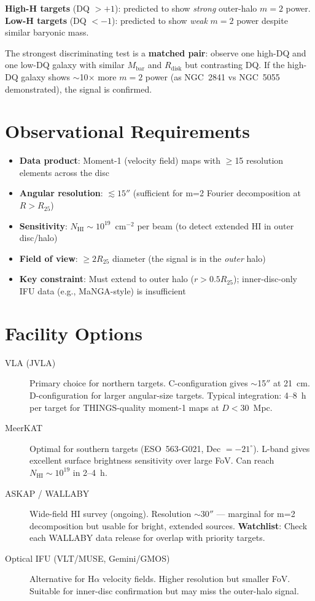 \documentclass[11pt]{article}
\newcommand{\mtwo}{m{=}2}
\begin{document}
\textbf{High-H targets} (DQ $> +1$): predicted to show \emph{strong} outer-halo $\mtwo$ power.\\
\textbf{Low-H targets} (DQ $< -1$): predicted to show \emph{weak} $\mtwo$ power despite similar baryonic mass.

The strongest discriminating test is a \textbf{matched pair}: observe one high-DQ and one low-DQ galaxy with similar $M_\mathrm{bar}$ and $R_\mathrm{disk}$ but contrasting DQ.
If the high-DQ galaxy shows $\sim$10$\times$ more $\mtwo$ power (as NGC~2841 vs NGC~5055 demonstrated), the signal is confirmed.

\section{Observational Requirements}

\begin{itemize}
\item \textbf{Data product}: Moment-1 (velocity field) maps with $\geq$15 resolution elements across the disc
\item \textbf{Angular resolution}: $\lesssim 15''$ (sufficient for m=2 Fourier decomposition at $R > R_{25}$)
\item \textbf{Sensitivity}: $N_\mathrm{HI} \sim 10^{19}$~cm$^{-2}$ per beam (to detect extended HI in outer disc/halo)
\item \textbf{Field of view}: $\geq 2 R_{25}$ diameter (the signal is in the \emph{outer} halo)
\item \textbf{Key constraint}: Must extend to outer halo ($r > 0.5 R_{25}$); inner-disc-only IFU data (e.g., MaNGA-style) is insufficient
\end{itemize}

\section{Facility Options}

\begin{description}
\item[VLA (JVLA)] Primary choice for northern targets. C-configuration gives $\sim$15$''$ at 21~cm.
  D-configuration for larger angular-size targets.
  Typical integration: 4--8~h per target for THINGS-quality moment-1 maps at $D < 30$~Mpc.

\item[MeerKAT] Optimal for southern targets (ESO~563-G021, Dec $= -21^\circ$).
  L-band gives excellent surface brightness sensitivity over large FoV.
  Can reach $N_\mathrm{HI} \sim 10^{19}$ in 2--4~h.

\item[ASKAP / WALLABY] Wide-field HI survey (ongoing). Resolution $\sim 30''$ --- marginal for m=2 decomposition but usable for bright, extended sources.
  \textbf{Watchlist}: Check each WALLABY data release for overlap with priority targets.

\item[Optical IFU (VLT/MUSE, Gemini/GMOS)] Alternative for H$\alpha$ velocity fields.
  Higher resolution but smaller FoV.
  Suitable for inner-disc confirmation but may miss the outer-halo signal.
\end{description}
\end{document}

